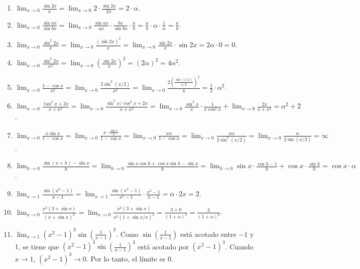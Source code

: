 \begin{enumerate}
    \item $\lim_{x \to 0} \frac{\sin 2x}{x} = \lim_{x \to 0} 2 \cdot \frac{\sin 2x}{2x} = 2 \cdot \alpha$.

    \item $\lim_{x \to 0} \frac{\sin ax}{\sin bx} = \lim_{x \to 0} \frac{\sin ax}{ax} \cdot \frac{bx}{\sin bx} \cdot \frac{a}{b} = \frac{a}{b} \cdot \alpha \cdot \frac{1}{\alpha} = \frac{a}{b}$.

    \item $\lim_{x \to 0} \frac{\sin^2 2x}{x} = \lim_{x \to 0} \frac{(\sin 2x)^2}{x} = \lim_{x \to 0} \frac{\sin 2x}{x} \cdot \sin 2x = 2\alpha \cdot 0 = 0$.

    \item $\lim_{x \to 0} \frac{\sin^2 2x}{x^2} = \lim_{x \to 0} \left(\frac{\sin 2x}{x}\right)^2 = (2\alpha)^2 = 4\alpha^2$.

    \item $\lim_{x \to 0} \frac{1 - \cos x}{x^2} = \lim_{x \to 0} \frac{2\sin^2(x/2)}{x^2} = \lim_{x \to 0} \frac{2\left(\frac{\sin(x/2)}{x/2}\right)^2}{4} = \frac{1}{2} \cdot \alpha^2$.

    \item $\lim_{x \to 0} \frac{\tan^2 x + 2x}{x + x^2} = \lim_{x \to 0} \frac{\sin^2 x / \cos^2 x + 2x}{x + x^2} = \lim_{x \to 0} \frac{\sin^2 x}{x} \cdot \frac{1}{x \cos^2 x} + \lim_{x \to 0} \frac{2x}{x + x^2} = \alpha^2 + 2$.

    \item $\lim_{x \to 0} \frac{x \sin x}{1 - \cos x} = \lim_{x \to 0} \frac{x \cdot \frac{\sin x}{x}}{1 - \cos x} = \lim_{x \to 0} \frac{x \alpha}{1 - \cos x} = \lim_{x \to 0} \frac{x \alpha}{2\sin^2(x/2)} = \lim_{x \to 0} \frac{\alpha}{2\sin(x/2)} = \infty$.

    \item $\lim_{h \to 0} \frac{\sin(x + h) - \sin x}{h} = \lim_{h \to 0} \frac{\sin x \cos h + \cos x \sin h - \sin x}{h} = \lim_{h \to 0} \sin x \cdot \frac{\cos h - 1}{h} + \cos x \cdot \frac{\sin h}{h} = \cos x \cdot \alpha$.

    \item $\lim_{x \to 1} \frac{\sin(x^2 - 1)}{x - 1} = \lim_{x \to 1} \frac{\sin(x^2 - 1)}{x^2 - 1} \cdot \frac{x^2 - 1}{x - 1} = \alpha \cdot 2x = 2$.

    \item $\lim_{x \to 0} \frac{x^2(3 + \sin x)}{(x + \sin x)^2} = \lim_{x \to 0} \frac{x^2(3 + \sin x)}{x^2(1 + \sin x / x)^2} = \frac{3 + 0}{(1 + \alpha)^2} = \frac{3}{(1 + \alpha)^2}$.

    \item $\lim_{x \to 1} (x^2 - 1)^3 \sin\left(\frac{1}{x - 1}\right)^3$. Como $\sin\left(\frac{1}{x - 1}\right)$ está acotado entre $-1$ y $1$, se tiene que $(x^2 - 1)^3 \sin\left(\frac{1}{x - 1}\right)^3$ está acotado por $(x^2 - 1)^3$. Cuando $x \to 1$, $(x^2 - 1)^3 \to 0$. Por lo tanto, el límite es $0$.
\end{enumerate}